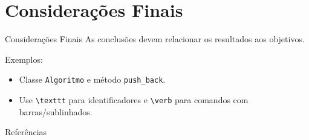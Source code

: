\documentclass[aspectratio=169]{beamer}
\begin{document}

\section{Considerações Finais}

\begin{frame}[fragile]{Considerações Finais}
As conclusões devem relacionar os resultados aos objetivos.

Exemplos:
\begin{itemize}
  \item Classe \texttt{Algoritmo} e método \verb|push_back|.
  \item Use \verb|\texttt| para identificadores e \verb|\verb| para comandos com barras/sublinhados.
\end{itemize}
\end{frame}

\begin{frame}[allowframebreaks]{Referências}
\printbibliography[heading=none]
\end{frame}
\end{document}
